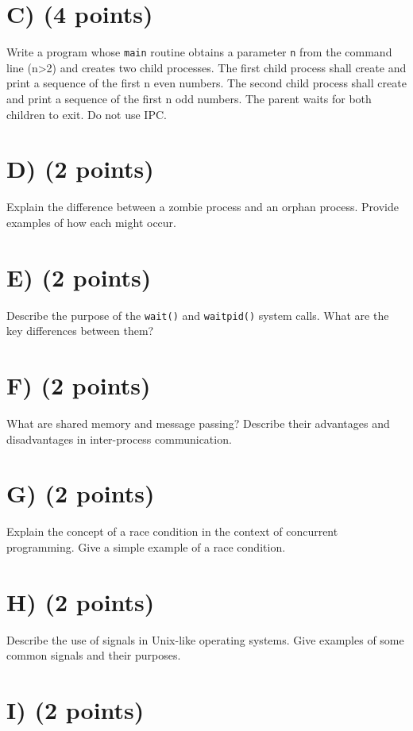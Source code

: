 \documentclass{article}
\begin{document}
\section*{C) (4 points)}

Write a program whose \texttt{main} routine obtains a parameter \texttt{n} from the command line (n>2) and creates two child processes. The first child process shall create and print a sequence of the first n even numbers. The second child process shall create and print a sequence of the first n odd numbers. The parent waits for both children to exit. Do not use IPC.


\section*{D) (2 points)}

Explain the difference between a zombie process and an orphan process.  Provide examples of how each might occur.


\section*{E) (2 points)}

Describe the purpose of the \texttt{wait()} and \texttt{waitpid()} system calls.  What are the key differences between them?


\section*{F) (2 points)}

What are shared memory and message passing? Describe their advantages and disadvantages in inter-process communication.


\section*{G) (2 points)}

Explain the concept of a race condition in the context of concurrent programming.  Give a simple example of a race condition.


\section*{H) (2 points)}

Describe the use of signals in Unix-like operating systems.  Give examples of some common signals and their purposes.


\section*{I) (2 points)}
\end{document}
